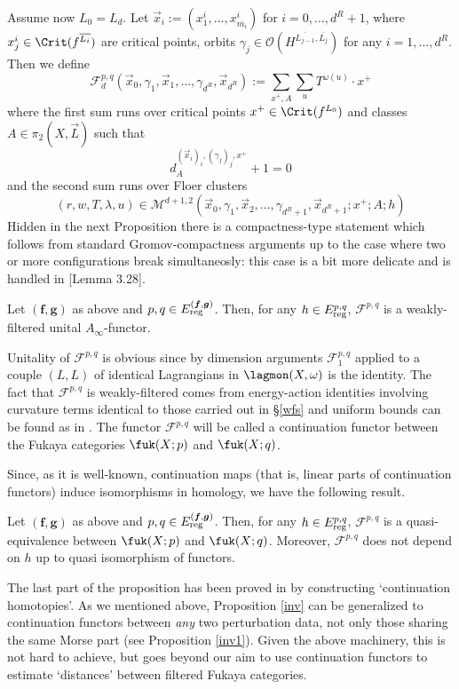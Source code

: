 	Assume now $L_0=L_d$. Let  $\vec{x}_i:=(x_1^i,\ldots,x_{\overline{m_i}}^i)$ for $i=0,\ldots,d^R+1$, where $x^i_j\in \Crit(f^{\overline{L_i}})$ are critical points, orbits $\gamma_j\in \mathcal{O}(H^{\overline{L_{j-1}},\overline{L_j}})$ for any $i=1,\ldots,d^R$. Then we define $$\mathcal{F}^{p,q}_d(\vec{x}_0, \gamma_1, \vec{x}_1,\ldots,\gamma_{d^R}, \vec{x}_{d^R}):=\sum_{x^+,A}\sum_u T^{\omega(u)}\cdot x^+$$ where the first sum runs over critical points $x^+\in \Crit(f^{L_0})$ and classes $A\in \pi_2(X,\vec{L})$ such that $$d_{A}^{(\vec{x}_i)_i, (\gamma_j)_j,x^+}+1=0$$ and the second sum runs over Floer clusters $$(r,w,T,\lambda,u)\in \mathcal{M}^{d+1,2}\left(\vec{x}_0, \gamma_1, \vec{x}_2,\ldots,\gamma_{d^R+1}, \vec{x}_{d^R+1}; x^+;A;h\right)$$
	Hidden in the next Proposition there is a compactness-type statement which follows from standard Gromov-compactness arguments up to the case where two or more configurations break simultaneosly: this case is a bit more delicate and is handled in [Lemma 3.28]\cite{Sylvan2019OnCategories}.
	\begin{prop}
		Let $(\boldsymbol{f}, \boldsymbol{g})$ as above and $p,q\in E^{(\boldsymbol{f}, \boldsymbol{g})}_\textnormal{reg}$. Then, for any $h\in E^{p,q}_\textnormal{reg}$, $\mathcal{F}^{p,q}$ is a weakly-filtered unital $A_\infty$-functor.
	\end{prop}
	Unitality of $\mathcal{F}^{p,q}$ is obvious since by dimension arguments $\mathcal{F}^{p,q}_1$ applied to a couple $(L,L)$ of identical Lagrangians in $\lagmon(X,\omega)$ is the identity. The fact that $\mathcal{F}^{p,q}$ is weakly-filtered comes from energy-action identities involving curvature terms identical to those carried out in \S \ref{wfs} and uniform bounds can be found as in \cite{Bi-Co-Sh:LagrSh}. The functor $\mathcal{F}^{p,q}$ will be called a continuation functor between the Fukaya categories $\fuk(X;p)$ and $\fuk(X;q)$.
	
	Since, as it is well-known, continuation maps (that is, linear parts of continuation functors) induce isomorphisms in homology, we have the following result.
	\begin{prop}\label{inv}
		Let $(\boldsymbol{f}, \boldsymbol{g})$ as above and $p,q\in E^{(\boldsymbol{f}, \boldsymbol{g})}_\textnormal{reg}$. Then, for any $h\in E^{p,q}_\textnormal{reg}$, $\mathcal{F}^{p,q}$ is a quasi-equivalence between $\fuk(X;p)$ and $\fuk(X;q)$. Moreover, $\mathcal{F}^{p,q}$ does not depend on $h$ up to quasi isomorphism of functors.
	\end{prop}
	\noindent The last part of the proposition has been proved in \cite{Sylvan2019OnCategories} by constructing `continuation homotopies'. As we mentioned above, Proposition \ref{inv} can be generalized to continuation functors between \textit{any} two perturbation data, not only those sharing the same Morse part (see Proposition \ref{inv1}). Given the above machinery, this is not hard to achieve, but goes beyond our aim to use continuation functors to estimate `distances' between filtered Fukaya categories.
	
